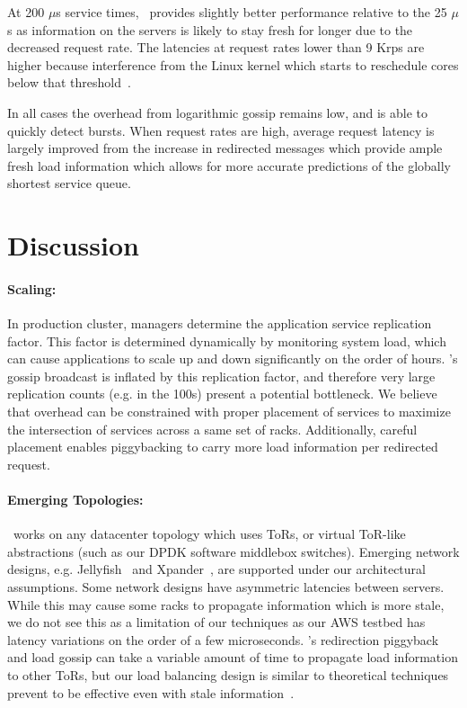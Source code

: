 At 200 $\mu$s service times, \toolname\ provides slightly better performance
relative to the 25 $\mu$s as information on the servers is likely to stay fresh
for longer due to the decreased request rate.  The latencies at request rates
lower than 9 Krps are higher because interference from the Linux kernel which
starts to reschedule cores below that threshold~\cite{mutilate}.

In all cases the overhead from logarithmic gossip remains low, and is able to
quickly detect bursts. When request rates are high, average request
latency is largely improved from the increase in redirected messages
which provide ample fresh load information which allows for more
accurate predictions of the globally shortest service queue.

\section{Discussion}
\label{sec:discuss}

\paragraph{Scaling:} In production cluster, managers determine the application
service replication factor. This factor is determined dynamically by monitoring
system load, which can cause applications to scale up and down significantly on
the order of hours.  \toolname{}'s gossip broadcast is inflated by this
replication factor, and therefore very large replication counts (e.g. in the
100s) present a potential bottleneck.  We believe that overhead can be
constrained with proper placement of services to maximize the intersection of
services across a same set of racks.  Additionally, careful placement enables
piggybacking to carry more load information per redirected request.

\paragraph{Emerging Topologies:} \toolname\ works on any datacenter topology
which uses ToRs, or virtual ToR-like abstractions (such as our DPDK software
middlebox switches). Emerging network designs, e.g. Jellyfish~\cite{jellyfish}
and Xpander~\cite{xpander}, are supported under our architectural assumptions.
Some network designs have asymmetric latencies between servers.  While this may
cause some racks to propagate information which is more stale, we do not see
this as a limitation of our techniques as our AWS testbed has latency variations
on the order of a few microseconds.  \toolname's redirection piggyback and load
gossip can take a variable amount of time to propagate load information to
other ToRs, but our load balancing design is similar to theoretical techniques
prevent to be effective even with stale information~\cite{lsq}. 

